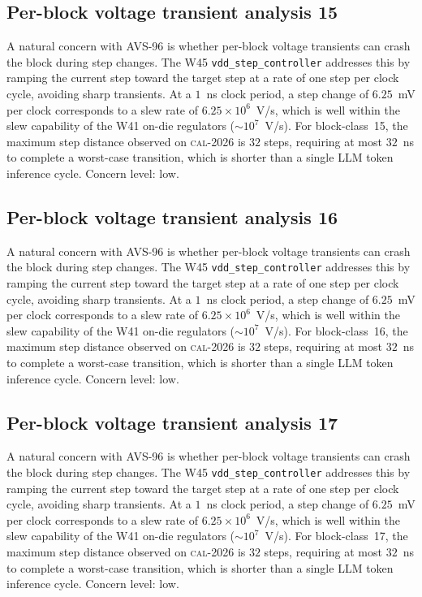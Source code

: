 \subsection{Per-block voltage transient analysis 15}

A natural concern with AVS-96 is whether per-block voltage transients
can crash the block during step changes. The W45 \texttt{vdd\_step\_controller} addresses this by ramping the current
step toward the target step at a rate of one step per clock cycle,
avoiding sharp transients. At a $1$~ns clock period, a step change of
$6.25$~mV per clock corresponds to a slew rate of $6.25\times 10^6$~V/s,
which is well within the slew capability of the W41 on-die regulators
($\sim 10^7$~V/s). For block-class~15, the maximum step distance
observed on \textsc{cal-2026} is $32$ steps, requiring at most $32$~ns
to complete a worst-case transition, which is shorter than a single
LLM token inference cycle. Concern level: low.


\subsection{Per-block voltage transient analysis 16}

A natural concern with AVS-96 is whether per-block voltage transients
can crash the block during step changes. The W45 \texttt{vdd\_step\_controller} addresses this by ramping the current
step toward the target step at a rate of one step per clock cycle,
avoiding sharp transients. At a $1$~ns clock period, a step change of
$6.25$~mV per clock corresponds to a slew rate of $6.25\times 10^6$~V/s,
which is well within the slew capability of the W41 on-die regulators
($\sim 10^7$~V/s). For block-class~16, the maximum step distance
observed on \textsc{cal-2026} is $32$ steps, requiring at most $32$~ns
to complete a worst-case transition, which is shorter than a single
LLM token inference cycle. Concern level: low.


\subsection{Per-block voltage transient analysis 17}

A natural concern with AVS-96 is whether per-block voltage transients
can crash the block during step changes. The W45 \texttt{vdd\_step\_controller} addresses this by ramping the current
step toward the target step at a rate of one step per clock cycle,
avoiding sharp transients. At a $1$~ns clock period, a step change of
$6.25$~mV per clock corresponds to a slew rate of $6.25\times 10^6$~V/s,
which is well within the slew capability of the W41 on-die regulators
($\sim 10^7$~V/s). For block-class~17, the maximum step distance
observed on \textsc{cal-2026} is $32$ steps, requiring at most $32$~ns
to complete a worst-case transition, which is shorter than a single
LLM token inference cycle. Concern level: low.


